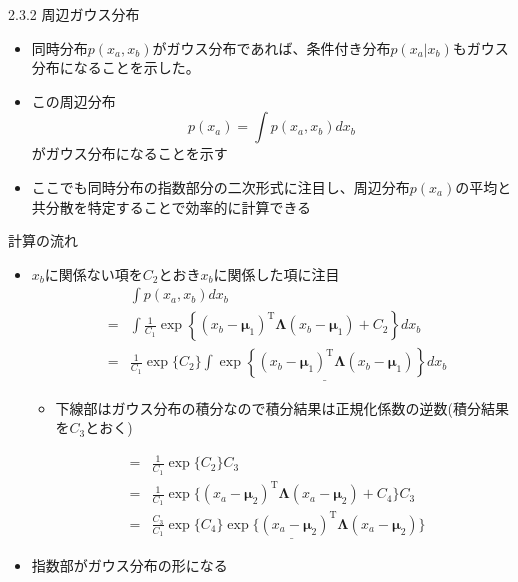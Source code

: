 \begin{frame}{2.3.2 周辺ガウス分布}
 \begin{itemize}
  \item 同時分布$p(x_a,x_b)$がガウス分布であれば、条件付き分布$p(x_a|x_b)$もガウス分布になることを示した。
  \item この周辺分布
        \begin{equation}
         p(x_a) = \int p(x_a,x_b)dx_b
        \end{equation}
        がガウス分布になることを示す
  \item ここでも同時分布の指数部分の二次形式に注目し、周辺分布$p(x_a)$の平均と共分散を特定することで効率的に計算できる
 \end{itemize}
\end{frame}


\begin{frame}{計算の流れ}
 \begin{itemize}
  \item $x_b$に関係ない項を$C_2$とおき$x_b$に関係した項に注目
        \begin{eqnarray*}
         && \int p(x_a,x_b)dx_b \\
         &=& \int \frac{1}{C_1}\exp\left\{(x_b-\bm{\mu}_1)^{\mathrm{T}}\bm{\Lambda}(x_b-\bm{\mu}_1)+C_2\right\}dx_b \\
         &=& \frac{1}{C_1}\exp\{C_2\}\underline{\int \exp\left\{(x_b-\bm{\mu}_1)^{\mathrm{T}}\bm{\Lambda}(x_b-\bm{\mu}_1)\right\}dx_b}
        \end{eqnarray*}
        \begin{itemize}
         \item 下線部はガウス分布の積分なので積分結果は正規化係数の逆数(積分結果を$C_3$とおく)
        \end{itemize}
        \begin{eqnarray*}
         &=&\frac{1}{C_1}\exp\{C_2\}C_3 \\
         &=&\frac{1}{C_1}\exp\{(x_a-\bm{\mu}_2)^{\mathrm{T}}\bm{\Lambda} (x_a-\bm{\mu}_2)+C_4\}C_3\\
         &=&\frac{C_3}{C_1}\underline{\exp\{C_4\}\exp\{(x_a-\bm{\mu}_2)^{\mathrm{T}}\bm{\Lambda} (x_a-\bm{\mu}_2)}\}
        \end{eqnarray*}
  \item 指数部がガウス分布の形になる
 \end{itemize}
\end{frame}


